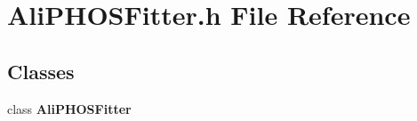 \section{Ali\-PHOSFitter.h File Reference}
\label{AliPHOSFitter_8h}
\subsection*{Classes}
\begin{CompactItemize}
\item 
class {\bf Ali\-PHOSFitter}
\end{CompactItemize}
